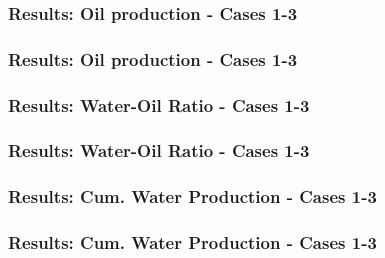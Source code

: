 \begin{frame}[label=oilprod13]
    \frametitle{Results: Oil production - Cases 1-3}
    \centerline{}
\end{frame}

\begin{frame}
    \frametitle{Results: Oil production - Cases 1-3}
    \centerline{}
\end{frame}

\begin{frame}[label=wor13]
    \frametitle{Results: Water-Oil Ratio - Cases 1-3}
    \centerline{}
\end{frame}

\begin{frame}[label=wor13]
    \frametitle{Results: Water-Oil Ratio - Cases 1-3}
    \centerline{}
\end{frame}

\begin{frame}
    \frametitle{Results: Cum. Water Production - Cases 1-3}
    \centerline{}
\end{frame}

\begin{frame}
    \frametitle{Results: Cum. Water Production - Cases 1-3}
    \centerline{}
\end{frame}

